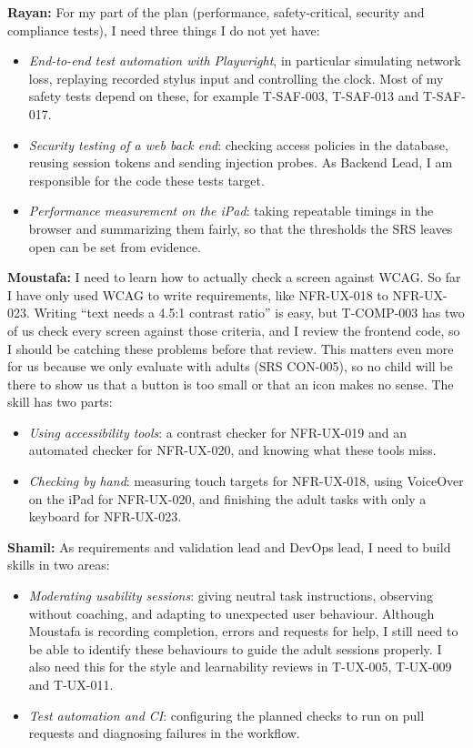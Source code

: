 \documentclass[12pt, titlepage]{article}
\begin{document}
\begin{enumerate}
\textbf{Rayan:} For my part of the plan (performance, safety-critical,
security and compliance tests), I need three things I do not yet have:
\begin{itemize}
\item \emph{End-to-end test automation with Playwright}, in particular
simulating network loss, replaying recorded stylus input and controlling
the clock. Most of my safety tests depend on these, for example
T-SAF-003, T-SAF-013 and T-SAF-017.
\item \emph{Security testing of a web back end}: checking access policies in
the database, reusing session tokens and sending injection probes. As
Backend Lead, I am responsible for the code these tests target.
\item \emph{Performance measurement on the iPad}: taking repeatable timings
in the browser and summarizing them fairly, so that the thresholds the SRS
leaves open can be set from evidence.
\end{itemize}

\textbf{Moustafa:} I need to learn how to actually check a screen against WCAG.
So far I have only used WCAG to write requirements, like NFR-UX-018 to
NFR-UX-023. Writing ``text needs a 4.5:1 contrast ratio'' is easy, but
T-COMP-003 has two of us check every screen against those criteria, and I review
the frontend code, so I should be catching these problems before that review.
This matters even more for us because we only evaluate with adults (SRS
CON-005), so no child will be there to show us that a button is too small or
that an icon makes no sense. The skill has two parts:
\begin{itemize}
\item \emph{Using accessibility tools}: a contrast checker for NFR-UX-019 and an
automated checker for NFR-UX-020, and knowing what these tools miss.
\item \emph{Checking by hand}: measuring touch targets for NFR-UX-018, using
VoiceOver on the iPad for NFR-UX-020, and finishing the adult tasks with only a
keyboard for NFR-UX-023.
\end{itemize}

\textbf{Shamil:} As requirements and validation lead and DevOps lead, I need to
build skills in two areas:
\begin{itemize}
\item \emph{Moderating usability sessions}: giving neutral task instructions, 
observing without coaching, and adapting to unexpected user behaviour. Although
Moustafa is recording completion, errors and requests for help, I 
still need to be able to identify these behaviours to guide the adult sessions
properly. I also need this for the style and learnability reviews in T-UX-005, 
T-UX-009 and T-UX-011.
\item \emph{Test automation and CI}: configuring the planned checks to run on
pull requests and diagnosing failures in the workflow.
\end{itemize}


\end{enumerate}
\end{document}

